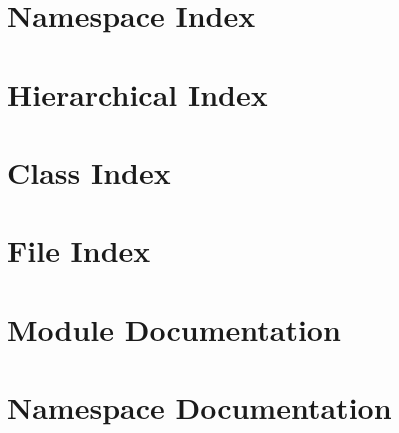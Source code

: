 \documentclass[twoside]{book}
\newcommand{\+}{\discretionary{\mbox{\scriptsize$\hookleftarrow$}}{}{}}
\begin{document}
\chapter{Namespace Index}

\chapter{Hierarchical Index}

\chapter{Class Index}

\chapter{File Index}

\chapter{Module Documentation}







\chapter{Namespace Documentation}





\end{document}
